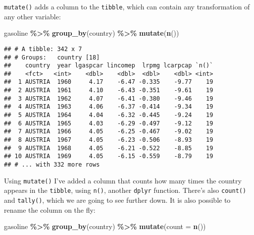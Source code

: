 \documentclass[
]{article}
\newenvironment{Shaded}{\begin{snugshade}}{\end{snugshade}}
\newcommand{\DataTypeTok}[1]{\textcolor[rgb]{0.13,0.29,0.53}{#1}}
\newcommand{\KeywordTok}[1]{\textcolor[rgb]{0.13,0.29,0.53}{\textbf{#1}}}
\newcommand{\NormalTok}[1]{#1}
\newcommand{\OperatorTok}[1]{\textcolor[rgb]{0.81,0.36,0.00}{\textbf{#1}}}
\newcommand{\StringTok}[1]{\textcolor[rgb]{0.31,0.60,0.02}{#1}}
\begin{document}
\texttt{mutate()} adds a column to the \texttt{tibble}, which can contain any transformation of any other
variable:

\begin{Shaded}
\begin{Highlighting}[]
\NormalTok{gasoline }\OperatorTok{\%\textgreater{}\%}
\StringTok{  }\KeywordTok{group\_by}\NormalTok{(country) }\OperatorTok{\%\textgreater{}\%}
\StringTok{  }\KeywordTok{mutate}\NormalTok{(}\KeywordTok{n}\NormalTok{())}
\end{Highlighting}
\end{Shaded}

\begin{verbatim}
## # A tibble: 342 x 7
## # Groups:   country [18]
##    country  year lgaspcar lincomep  lrpmg lcarpcap `n()`
##    <fct>   <int>    <dbl>    <dbl>  <dbl>    <dbl> <int>
##  1 AUSTRIA  1960     4.17    -6.47 -0.335    -9.77    19
##  2 AUSTRIA  1961     4.10    -6.43 -0.351    -9.61    19
##  3 AUSTRIA  1962     4.07    -6.41 -0.380    -9.46    19
##  4 AUSTRIA  1963     4.06    -6.37 -0.414    -9.34    19
##  5 AUSTRIA  1964     4.04    -6.32 -0.445    -9.24    19
##  6 AUSTRIA  1965     4.03    -6.29 -0.497    -9.12    19
##  7 AUSTRIA  1966     4.05    -6.25 -0.467    -9.02    19
##  8 AUSTRIA  1967     4.05    -6.23 -0.506    -8.93    19
##  9 AUSTRIA  1968     4.05    -6.21 -0.522    -8.85    19
## 10 AUSTRIA  1969     4.05    -6.15 -0.559    -8.79    19
## # ... with 332 more rows
\end{verbatim}

Using \texttt{mutate()} I've added a column that counts how many times the country appears in the \texttt{tibble},
using \texttt{n()}, another \texttt{dplyr} function. There's also \texttt{count()} and \texttt{tally()}, which we are going to
see further down. It is also possible to rename the column on the fly:

\begin{Shaded}
\begin{Highlighting}[]
\NormalTok{gasoline }\OperatorTok{\%\textgreater{}\%}
\StringTok{  }\KeywordTok{group\_by}\NormalTok{(country) }\OperatorTok{\%\textgreater{}\%}
\StringTok{  }\KeywordTok{mutate}\NormalTok{(}\DataTypeTok{count =} \KeywordTok{n}\NormalTok{())}
\end{Highlighting}
\end{Shaded}
\end{document}
